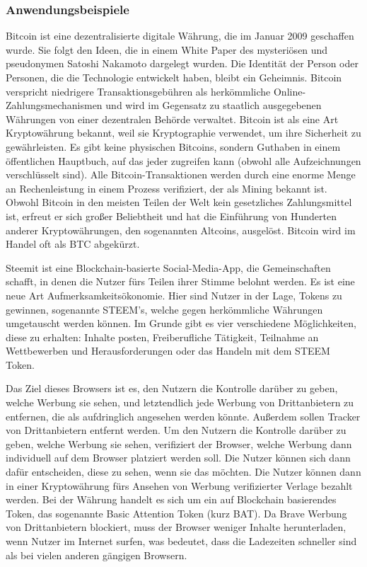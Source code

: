 \subsubsection{Anwendungsbeispiele}

Bitcoin ist eine dezentralisierte digitale Währung, die im Januar 2009 geschaffen wurde.
Sie folgt den Ideen, die in einem White Paper des mysteriösen und pseudonymen Satoshi Nakamoto dargelegt wurden.
Die Identität der Person oder Personen, die die Technologie entwickelt haben, bleibt ein Geheimnis.
Bitcoin verspricht niedrigere Transaktionsgebühren als herkömmliche Online-Zahlungsmechanismen und wird im Gegensatz zu staatlich ausgegebenen Währungen von einer dezentralen Behörde verwaltet.
Bitcoin ist als eine Art Kryptowährung bekannt, weil sie Kryptographie verwendet, um ihre Sicherheit zu gewährleisten.
Es gibt keine physischen Bitcoins, sondern Guthaben in einem öffentlichen Hauptbuch, auf das jeder zugreifen kann (obwohl alle Aufzeichnungen verschlüsselt sind).
Alle Bitcoin-Transaktionen werden durch eine enorme Menge an Rechenleistung in einem Prozess verifiziert, der als Mining bekannt ist.
Obwohl Bitcoin in den meisten Teilen der Welt kein gesetzliches Zahlungsmittel ist, erfreut er sich großer Beliebtheit und hat die Einführung von Hunderten anderer Kryptowährungen, den sogenannten Altcoins, ausgelöst.
Bitcoin wird im Handel oft als BTC abgekürzt.

Steemit ist eine Blockchain-basierte Social-Media-App, die Gemeinschaften schafft, in denen die Nutzer fürs Teilen ihrer Stimme belohnt werden.
Es ist eine neue Art Aufmerksamkeitsökonomie.
Hier sind Nutzer in der Lage, Tokens zu gewinnen, sogenannte STEEM’s, welche gegen herkömmliche Währungen umgetauscht werden können.
Im Grunde gibt es vier verschiedene Möglichkeiten, diese zu erhalten: Inhalte posten, Freiberufliche Tätigkeit, Teilnahme an Wettbewerben und Herausforderungen oder das Handeln mit dem STEEM Token.

Das Ziel dieses Browsers ist es, den Nutzern die Kontrolle darüber zu geben, welche Werbung sie sehen, und letztendlich jede Werbung von Drittanbietern zu entfernen, die als aufdringlich angesehen werden könnte.
Außerdem sollen Tracker von Drittanbietern entfernt werden.
Um den Nutzern die Kontrolle darüber zu geben, welche Werbung sie sehen, verifiziert der Browser, welche Werbung dann individuell auf dem Browser platziert werden soll.
Die Nutzer können sich dann dafür entscheiden, diese zu sehen, wenn sie das möchten.
Die Nutzer können dann in einer Kryptowährung fürs Ansehen von Werbung verifizierter Verlage bezahlt werden.
Bei der Währung handelt es sich um ein auf Blockchain basierendes Token, das sogenannte Basic Attention Token (kurz BAT).
Da Brave Werbung von Drittanbietern blockiert, muss der Browser weniger Inhalte herunterladen, wenn Nutzer im Internet surfen, was bedeutet, dass die Ladezeiten schneller sind  als bei vielen anderen gängigen Browsern.







